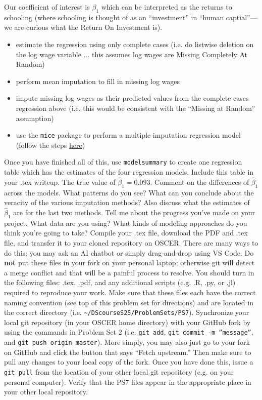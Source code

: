 \documentclass[12pt,english]{exam}
\begin{document}
\begin{questions}
\[\]
Our coefficient of interest is $\beta_{1}$ which can be interpreted as the returns to schooling (where schooling is thought of as an ``investment'' in ``human captial''---we are curious what the Return On Investment is).
\begin{itemize}
    \item estimate the regression using only complete cases (i.e. do listwise deletion on the log wage variable ... this assumes log wages are Missing Completely At Random)
    \item perform mean imputation to fill in missing log wages
    \item impute missing log wages as their predicted values from the complete cases regression above (i.e. this would be consistent with the ``Missing at Random'' assumption)
    \item use the \texttt{mice} package to perform a multiple imputation regression model (follow the steps \href{https://vincentarelbundock.github.io/modelsummary/articles/modelsummary.html#multiple-imputation}{here})
\end{itemize}
Once you have finished all of this, use \texttt{modelsummary} to create one regression table which has the estimates of the four regression models. Include this table in your .tex writeup. 
The true value of $\hat{\beta}_{1}=0.093$. Comment on the differences of $\hat{\beta}_{1}$ across the models. What patterns do you see? What can you conclude about the veracity of the various imputation methods? Also discuss what the estimates of $\hat{\beta}_{1}$ are for the last two methods.
\question Tell me about the progress you've made on your project. What data are you using? What kinds of modeling approaches do you think you're going to take?  
\question Compile your .tex file, download the PDF and .tex file, and transfer it to your cloned repository on OSCER. There are many ways to do this;  you may ask an AI chatbot or simply drag-and-drop using VS Code. Do \textbf{not} put these files in your fork on your personal laptop; otherwise git will detect a merge conflict and that will be a painful process to resolve.
\question You should turn in the following files: .tex, .pdf, and any additional scripts (e.g. .R, .py, or .jl) required to reproduce your work.  Make sure that these files each have the correct naming convention (see top of this problem set for directions) and are located in the correct directory (i.e. \texttt{\textasciitilde/DScourseS25/ProblemSets/PS7}).
\question Synchronize your local git repository (in your OSCER home directory) with your GitHub fork by using the commands in Problem Set 2 (i.e. \texttt{git add}, \texttt{git commit -m ''message''}, and \texttt{git push origin master}). More simply, you may also just go to your fork on GitHub and click the button that says ``Fetch upstream.'' Then make sure to pull any changes to your local copy of the fork. Once you have done this, issue a \texttt{git pull} from the location of your other local git repository (e.g. on your personal computer). Verify that the PS7 files appear in the appropriate place in your other local repository.
\end{questions}
\end{document}
